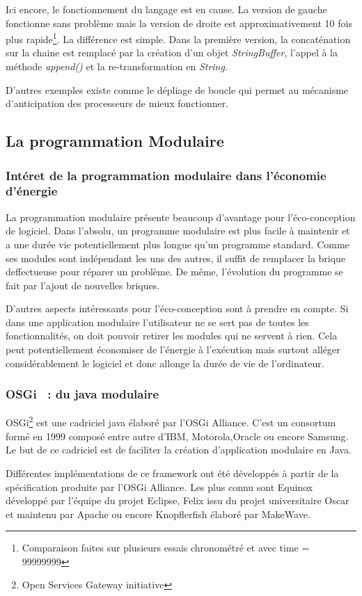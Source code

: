 \documentclass[a4paper, 11pt]{report}
\begin{document}
Ici encore, le fonctionnement du langage est en cause. La version de gauche fonctionne sans problème mais la version de droite est approximativement 10 fois plus rapide\footnote{Comparaison faites sur plusieurs essais chronométré et avec time = 99999999}. La différence est simple. Dans la première version, la concaténation sur la chaine est remplacé par la création d'un objet \textit{StringBuffer}, l'appel à la méthode \textit{append()} et la re-transformation en \textit{String}.

D'autres exemples existe comme le dépliage de boucle\cite{EcoLogiciels} qui permet au mécanisme d'anticipation des processeurs de mieux fonctionner.

		\subsection{La programmation Modulaire}
			\subsubsection{Intéret de la programmation modulaire dans l'économie d'énergie}
La programmation modulaire présente beaucoup d'avantage pour l'éco-conception de logiciel. Dans l'absolu, un programme modulaire est plus facile à maintenir et a une durée vie potentiellement plus longue qu'un programme standard. Comme ses modules sont indépendant les uns des autres, il suffit de remplacer la brique deffectueuse pour réparer un problème. De même, l'évolution du programme se fait par l'ajout de nouvelles briques.

D'autres aspects intéressants pour l'éco-conception sont à prendre en compte. Si dans une application modulaire l'utilisateur ne se sert pas de toutes les fonctionnalités, on doit pouvoir retirer les modules qui ne servent à rien. Cela peut potentiellement économiser de l'énergie à l'exécution mais surtout alléger considérablement le logiciel et donc allonge la durée de vie de l'ordinateur.

			\subsubsection{OSGi ~: du java modulaire}
OSGi\footnote{Open Services Gateway initiative} est une cadriciel java élaboré par l'OSGi Alliance. C'est un consortum formé en 1999 composé entre autre d'IBM, Motorola,Oracle ou encore Samsung. Le but de ce cadriciel est de faciliter la création d'application modulaire en Java. 

Différentes implémentations de ce framework ont été développés à partir de la spécification produite par l'OSGi Alliance. Les plus connu sont Equinox développé par l’équipe du projet Eclipse, Felix issu du projet universitaire Oscar et maintenu par Apache ou encore Knopflerfish élaboré par MakeWave.
		
\end{document}
